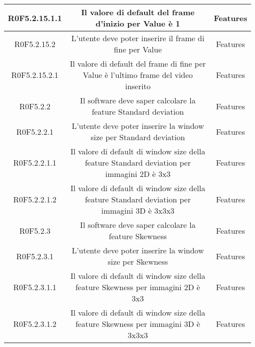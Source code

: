 \begin{center}
\begin{longtable}{|c|c|c|}
\hline
R0F5.2.15.1.1   & \parbox[t]{\larghezza}{Il valore di default del frame d'inizio per Value è 1}  & \parbox[t]{\dimFonti}{ Features \\} \\
\hline
R0F5.2.15.2   & \parbox[t]{\larghezza}{L'utente deve poter inserire il frame di fine per Value}  & \parbox[t]{\dimFonti}{ Features \\} \\
\hline
R0F5.2.15.2.1   & \parbox[t]{\larghezza}{Il valore di default del frame di fine per Value è l'ultimo frame del video inserito}  & \parbox[t]{\dimFonti}{ Features \\} \\
\hline
R0F5.2.2   & \parbox[t]{\larghezza}{Il software deve saper calcolare la feature\glossario{} Standard deviation}  & \parbox[t]{\dimFonti}{ Features \\} \\
\hline
R0F5.2.2.1   & \parbox[t]{\larghezza}{L'utente deve poter inserire la window size per Standard deviation}  & \parbox[t]{\dimFonti}{ Features \\} \\
\hline
R0F5.2.2.1.1   & \parbox[t]{\larghezza}{Il valore di default di window size della feature Standard deviation per immagini 2D è 3x3 }  & \parbox[t]{\dimFonti}{ Features \\} \\
\hline
R0F5.2.2.1.2   & \parbox[t]{\larghezza}{Il valore di default di window size della feature Standard deviation per immagini 3D è 3x3x3 }  & \parbox[t]{\dimFonti}{ Features \\} \\
\hline
R0F5.2.3   & \parbox[t]{\larghezza}{Il software deve saper calcolare la feature Skewness}  & \parbox[t]{\dimFonti}{ Features \\} \\
\hline
R0F5.2.3.1   & \parbox[t]{\larghezza}{L'utente deve poter inserire la window size per Skewness}  & \parbox[t]{\dimFonti}{ Features \\} \\
\hline
R0F5.2.3.1.1   & \parbox[t]{\larghezza}{Il valore di default di window size della feature Skewness per immagini 2D è 3x3 }  & \parbox[t]{\dimFonti}{ Features \\} \\
\hline
R0F5.2.3.1.2   & \parbox[t]{\larghezza}{Il valore di default di window size della feature Skewness per immagini 3D è 3x3x3 }  & \parbox[t]{\dimFonti}{ Features \\} \\

\end{longtable}
\end{center}
